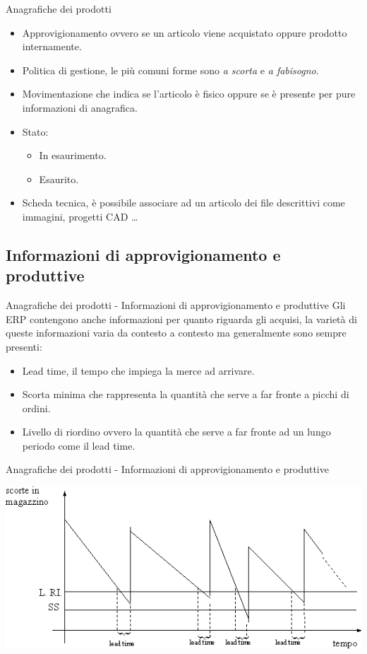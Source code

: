 \documentclass{beamer}
\begin{document}
    \begin{frame}{Anagrafiche dei prodotti}
        \begin{itemize}
            \item Approvigionamento ovvero se un articolo viene acquistato oppure prodotto internamente.
            \item Politica di gestione, le più comuni forme sono \textit{a scorta} e \textit{a fabisogno}.
            \item Movimentazione che indica se l'articolo è fisico oppure se è presente per pure informazioni di anagrafica.
            \item Stato:
            \begin{itemize}
                \item In esaurimento.
                \item Esaurito.
            \end{itemize}
            \item Scheda tecnica, è possibile associare ad un articolo dei file descrittivi come immagini, progetti CAD \dots
        \end{itemize}
    \end{frame}

    \subsection{Informazioni di approvigionamento e produttive}
    \begin{frame}{Anagrafiche dei prodotti - Informazioni di approvigionamento e produttive}
        Gli ERP contengono anche informazioni per quanto riguarda gli acquisi, la varietà di queste informazioni varia da contesto a contesto ma generalmente sono sempre presenti:
        \begin{itemize}
            \item Lead time, il tempo che impiega la merce ad arrivare.
            \item Scorta minima che rappresenta la quantità che serve a far fronte a picchi di ordini.
            \item Livello di riordino ovvero la quantità che serve a far fronte ad un lungo periodo come il lead time.
        \end{itemize}
    \end{frame}

    \begin{frame}{Anagrafiche dei prodotti - Informazioni di approvigionamento e produttive}
        \begin{center}
            \includegraphics[scale=0.5]{livello_di_riordino.png}
        \end{center}
    \end{frame}
\end{document}

